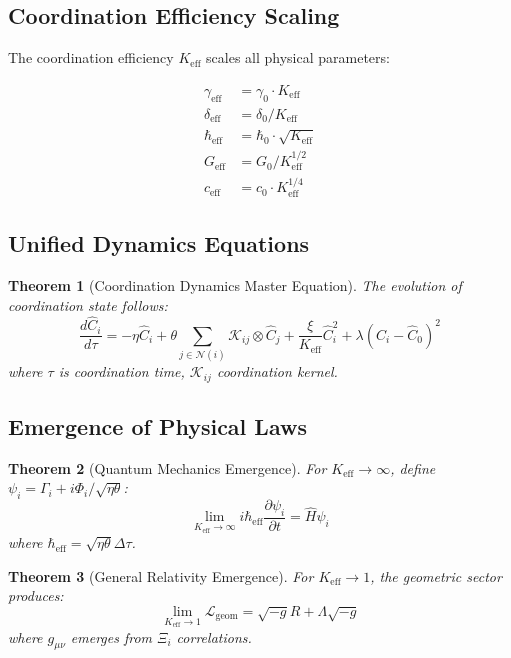 \documentclass[11pt,a4paper]{article}
\newtheorem{theorem}{Theorem}
\begin{document}
\subsection{Coordination Efficiency Scaling}

The coordination efficiency $K_{\mathrm{eff}}$ scales all physical parameters:

\[
\begin{aligned}
	\gamma_{\mathrm{eff}} &= \gamma_0 \cdot K_{\mathrm{eff}} \\
	\delta_{\mathrm{eff}} &= \delta_0 / K_{\mathrm{eff}} \\
	\hbar_{\mathrm{eff}} &= \hbar_0 \cdot \sqrt{K_{\mathrm{eff}}} \\
	G_{\mathrm{eff}} &= G_0 / K_{\mathrm{eff}}^{1/2} \\
	c_{\mathrm{eff}} &= c_0 \cdot K_{\mathrm{eff}}^{1/4}
\end{aligned}
\]

\subsection{Unified Dynamics Equations}

\begin{theorem}[Coordination Dynamics Master Equation]
	The evolution of coordination state follows:
	\[
	\frac{d\hat{C}_i}{d\tau} = -\eta \hat{C}_i + \theta \sum_{j \in \mathcal{N}(i)} \mathcal{K}_{ij} \otimes \hat{C}_j + \frac{\xi}{K_{\mathrm{eff}}} \hat{C}_i^2 + \lambda (\hat{C}_i - \hat{C}_0)^2
	\]
	where $\tau$ is coordination time, $\mathcal{K}_{ij}$ coordination kernel.
\end{theorem}

\subsection{Emergence of Physical Laws}

\begin{theorem}[Quantum Mechanics Emergence]
	For $K_{\mathrm{eff}} \to \infty$, define $\psi_i = \Gamma_i + i\Phi_i/\sqrt{\eta\theta}$:
	\[
	\lim_{K_{\mathrm{eff}} \to \infty} i\hbar_{\mathrm{eff}}\frac{\partial\psi_i}{\partial t} = \hat{H}\psi_i
	\]
	where $\hbar_{\mathrm{eff}} = \sqrt{\eta\theta}\Delta\tau$.
\end{theorem}

\begin{theorem}[General Relativity Emergence]  
	For $K_{\mathrm{eff}} \to 1$, the geometric sector produces:
	\[
	\lim_{K_{\mathrm{eff}} \to 1} \mathcal{L}_{\mathrm{geom}} = \sqrt{-g}R + \Lambda\sqrt{-g}
	\]
	where $g_{\mu\nu}$ emerges from $\Xi_i$ correlations.
\end{theorem}
\end{document}
